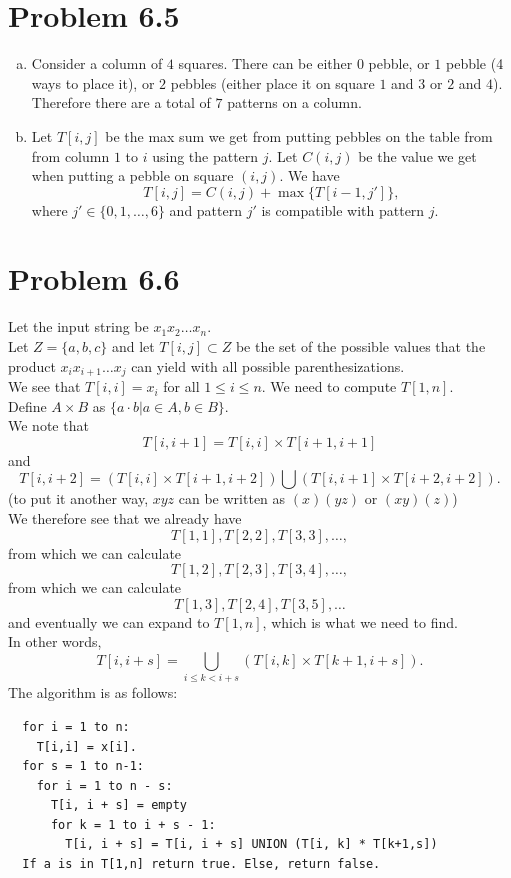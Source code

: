 \documentclass[12pt]{report}
\begin{document}
\section{Problem 6.5}
\begin{enumerate}[(a)]
\item Consider a column of $4$ squares. There can be either $0$ pebble, or $1$ pebble (4 ways to place it), or $2$ pebbles (either place it on square $1$ and $3$ or $2$ and $4$). Therefore there are a total of $7$ patterns on a column.
\item Let $T[i,j]$ be the max sum we get from putting pebbles on the table from from column $1$ to $i$ using the pattern $j$. Let $C(i,j)$ be the value we get when putting a pebble on square $(i,j)$. We have $$T[i,j] = C(i,j) + \max \{ T[i-1,j'] \}, $$
where $j' \in \{0,1,\ldots,6\}$ and pattern $j'$ is compatible with pattern $j$.
\end{enumerate}

\section{Problem 6.6}
Let the input string be $x_1 x_2 \ldots x_n$. \\
Let $Z = \{a,b,c\}$ and let $T[i,j] \subset Z$ be the set of the possible values that the product $x_i x_{i+1} \ldots x_{j}$ can yield with all possible parenthesizations. \\
We see that $T[i,i] = x_i$ for all $1 \le i \le n$. We need to compute $T[1,n]$. \\
Define $A \times B$ as $\{ a \cdot b | a \in A, b \in B\}$. \\
We note that $$T[i, i+1] = T[i,i] \times T[i+1, i+1]$$ and $$T[i,i+2] = (T[i,i] \times T[i+1, i+2]) \bigcup (T[i,i+1] \times T[i+2,i+2]).$$
(to put it another way, $xyz$ can be written as $(x)(yz)$ or $(xy)(z)$) \\
We therefore see that we already have $$T[1,1], T[2,2], T[3,3], \ldots,$$
from which we can calculate $$T[1,2], T[2,3], T[3,4], \ldots,$$
from which we can calculate $$T[1,3], T[2,4], T[3,5], \ldots $$
and eventually we can expand to $T[1,n]$, which is what we need to find.\\
In other words, $$T[i, i + s] = \bigcup_{i \le k < i + s} (T[i,k] \times T[k+1, i + s]).$$
The algorithm is as follows:
\begin{lstlisting}
  for i = 1 to n: 
    T[i,i] = x[i].
  for s = 1 to n-1:
    for i = 1 to n - s:
      T[i, i + s] = empty
      for k = 1 to i + s - 1:
        T[i, i + s] = T[i, i + s] UNION (T[i, k] * T[k+1,s])
  If a is in T[1,n] return true. Else, return false.
\end{lstlisting}
\end{document}
